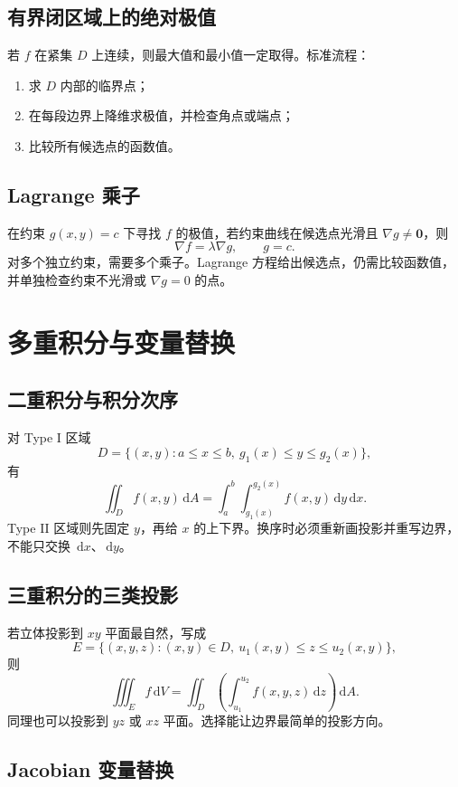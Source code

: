 \documentclass[UTF8,a4paper,10pt,fontset=fandol]{ctexart}
\newcommand{\dd}{\,\mathrm{d}}
\newcommand{\vect}[1]{\mathbf{#1}}
\begin{document}
\subsection{有界闭区域上的绝对极值}

若 $f$ 在紧集 $D$ 上连续，则最大值和最小值一定取得。标准流程：
\begin{enumerate}
  \item 求 $D$ 内部的临界点；
  \item 在每段边界上降维求极值，并检查角点或端点；
  \item 比较所有候选点的函数值。
\end{enumerate}

\subsection{Lagrange 乘子}

在约束 $g(x,y)=c$ 下寻找 $f$ 的极值，若约束曲线在候选点光滑且 $\nabla g\ne\vect0$，则
\[
\nabla f=\lambda\nabla g,
\qquad
g=c.
\]
对多个独立约束，需要多个乘子。Lagrange 方程给出候选点，仍需比较函数值，并单独检查约束不光滑或 $\nabla g=0$ 的点。

\section{多重积分与变量替换}

\subsection{二重积分与积分次序}

对 Type I 区域
\[
D=\{(x,y):a\le x\le b,\ g_1(x)\le y\le g_2(x)\},
\]
有
\[
\iint_D f(x,y)\dd A
=\int_a^b\int_{g_1(x)}^{g_2(x)}f(x,y)\dd y\dd x.
\]
Type II 区域则先固定 $y$，再给 $x$ 的上下界。换序时必须重新画投影并重写边界，不能只交换 $\dd x$、$\dd y$。

\subsection{三重积分的三类投影}

若立体投影到 $xy$ 平面最自然，写成
\[
E=\{(x,y,z):(x,y)\in D,\ u_1(x,y)\le z\le u_2(x,y)\},
\]
则
\[
\iiint_E f\dd V
=\iint_D\left(\int_{u_1}^{u_2}f(x,y,z)\dd z\right)\dd A.
\]
同理也可以投影到 $yz$ 或 $xz$ 平面。选择能让边界最简单的投影方向。

\subsection{Jacobian 变量替换}
\end{document}
